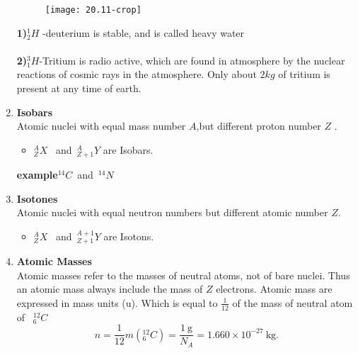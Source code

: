 \begin{enumerate}
\begin{figure}[H]
	\centering
	\texttt{[image: 20.11-crop]}
	\caption{}
	\label{}
\end{figure}
\begin{note}
	\textbf{1)}\quad $^1_2 H$ -\quad deuterium is stable, and is called heavy water\\\\
		\textbf{2)}\quad $^3_1H$-Tritium is radio active, which are found in atmosphere by the nuclear reactions of cosmic rays in the atmosphere.  Only about $2kg$ of tritium is present at any time of earth.
\end{note}
\item  \textbf{Isobars}\\
Atomic nuclei with equal mass number $A$,but different proton number $Z$ .
\begin{itemize}
	\item $^A_Z X$ \  and\ $^A_{Z+1} Y$ are Isobars.
\end{itemize}
\textbf{example}\quad $^{14}C$\  and\  $^{14} N$
\item  \textbf{Isotones}\\
Atomic nuclei with equal neutron numbers but different atomic number $Z$.
\begin{itemize}
	\item $^A_Z X$ \  and\ $^{A+1}_{Z+1} Y$ are Isotons.
\end{itemize}
\item  \textbf{Atomic Masses}\\
Atomic masses refer to the masses of neutral atoms, not of bare nuclei. Thus an atomic mass always include the mass of $Z$ electrons. Atomic mass are expressed in mass units (u). Which is equal to $\frac{1}{12}$ of the mass of neutral atom of \ $^{12}_6 C$\\
$$n=\frac{1}{12} m\left({ }{^{12}_6C}\right)=\frac{1 \mathrm{~g}}{N_{A}}=1.660 \times 10^{-27} \mathrm{~kg} .$$
\begin{center}
	\framebox{
		\parbox[t][0.5cm]{3.5cm}{
			
			\addvspace{-0.5cm} \centering
			
}}
\end{center}
\end{enumerate}
